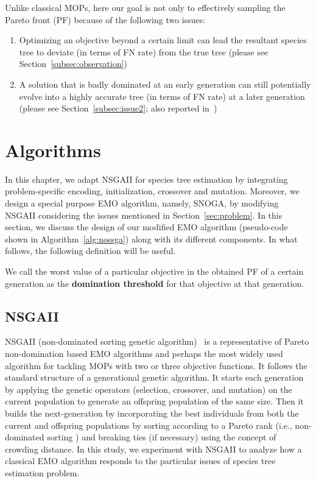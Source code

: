 Unlike classical MOPs, here our goal is not only to effectively sampling the Pareto front (PF) because of the following two issues:
\begin{enumerate}[label=$I_\arabic*$]
	\item \label{item:i1} Optimizing an objective beyond a certain limit can lead the resultant species tree to deviate (in terms of FN rate) from the true tree (please see Section~\ref{subsec:observation})
\item \label{item:i2} A solution that is badly dominated at an early generation can still potentially evolve into a highly accurate tree (in terms of FN rate) at a later generation (please see Section~\ref{subsec:issue2}; also reported in~\cite{qu2010multi})
\end{enumerate}



%
 \section{Algorithms}
\label{sec:method}
In this chapter, we adapt NSGAII for species tree estimation by integrating problem-specific encoding, initialization, crossover and mutation. Moreover, we design a special purpose EMO algorithm, namely, SNOGA, by modifying NSGAII considering the issues mentioned in Section~\ref{sec:problem}. In this section, we discuss the design of our modified EMO algorithm (pseudo-code shown in Algorithm~\ref{alg:nossga}) along with its different components. In what follows, the following definition will be useful. 

 \label{def:domination_threshold}
{
	\small
	We call the worst value of a particular objective in the obtained PF of a certain generation as the \textbf{domination threshold} for that objective at that generation.
}

\subsection{NSGAII}
NSGAII (non-dominated sorting genetic algorithm)~\cite{deb2002fast} is a representative of Pareto non-domination based EMO algorithms and perhaps the most widely used algorithm for tackling MOPs with two or three objective functions. It follows the standard structure of a generational genetic algorithm. It starts each generation by applying the genetic operators (selection, crossover, and mutation) on the current population to generate an offspring population of the same size. Then it builds the next-generation by incorporating the best individuals from both the current and offspring populations by sorting according to a Pareto rank (i.e., non-dominated sorting ) and breaking ties (if necessary) using the concept of crowding distance. In this study, we experiment with NSGAII to analyze how a classical EMO algorithm responds to the particular issues of species tree estimation problem. 

